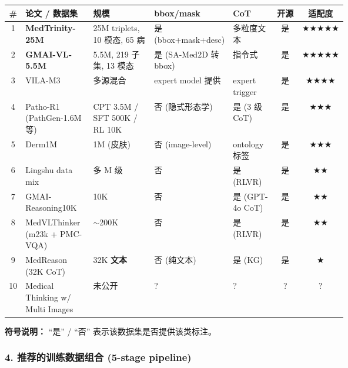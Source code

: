 \begin{center}
\renewcommand{\arraystretch}{1.3}
\setlength{\tabcolsep}{4pt}
\footnotesize
\begin{tabular}{|c|p{0.20\linewidth}|p{0.18\linewidth}|p{0.16\linewidth}|p{0.13\linewidth}|c|c|}
\hline
\# & 论文 / 数据集 & 规模 & bbox/mask & CoT & 开源 & 适配度 \\
\hline
1 & \textbf{MedTrinity-25M} & 25M triplets, 10 模态, 65 病 & 是 (bbox+mask+desc) & 多粒度文本 & 是 & $\bigstar\bigstar\bigstar\bigstar\bigstar$ \\
\hline
2 & \textbf{GMAI-VL-5.5M} & 5.5M, 219 子集, 13 模态 & 是 (SA-Med2D 转 bbox) & 指令式 & 是 & $\bigstar\bigstar\bigstar\bigstar\bigstar$ \\
\hline
3 & VILA-M3 & 多源混合 & expert model 提供 & expert trigger & 是 & $\bigstar\bigstar\bigstar\bigstar$ \\
\hline
4 & Patho-R1 (PathGen-1.6M 等) & CPT 3.5M / SFT 500K / RL 10K & 否 (隐式形态学) & 是 (3 级 CoT) & 是 & $\bigstar\bigstar\bigstar$ \\
\hline
5 & Derm1M & 1M (皮肤) & 否 (image-level) & ontology 标签 & 是 & $\bigstar\bigstar\bigstar$ \\
\hline
6 & Lingshu data mix & 多 M 级 & 否 & 是 (RLVR) & 是 & $\bigstar\bigstar$ \\
\hline
7 & GMAI-Reasoning10K & 10K & 否 & 是 (GPT-4o CoT) & 是 & $\bigstar\bigstar$ \\
\hline
8 & MedVLThinker (m23k + PMC-VQA) & $\sim$200K & 否 & 是 (RLVR) & 是 & $\bigstar\bigstar$ \\
\hline
9 & MedReason (32K CoT) & 32K \textbf{文本} & 否 (纯文本) & 是 (KG) & 是 & $\bigstar$ \\
\hline
10 & Medical Thinking w/ Multi Images & 未公开 & ? & ? & ? & ? \\
\hline
\end{tabular}
\end{center}

\textbf{符号说明：} ``是'' / ``否'' 表示该数据集是否提供该类标注。

\subsubsection*{4. 推荐的训练数据组合 (5-stage pipeline)}

